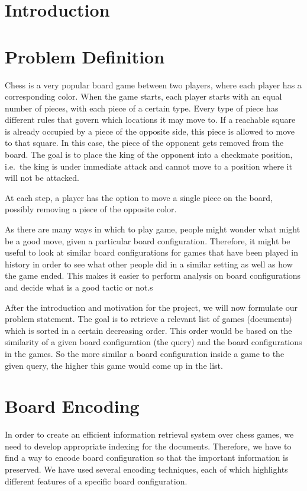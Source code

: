\documentclass[11pt]{article}
\begin{document}
    \section{Introduction}


    \section{Problem Definition}

    Chess is a very popular board game between two players, where each player has a corresponding color. When the game starts, each player starts with an equal number of pieces, with each piece of a certain type. Every type of piece has different rules that govern which locations it may move to. If a reachable square is already occupied by a piece of the opposite side, this piece is allowed to move to that square. In this case, the piece of the opponent gets removed from the board. The goal is to place the king of the opponent into a checkmate position, i.e.\ the king is under immediate attack and cannot move to a position where it will not be attacked.

    At each step, a player has the option to move a single piece on the board, possibly removing a piece of the opposite color.

    As there are many ways in which to play game, people might wonder what might be a good move, given a particular board configuration. Therefore, it might be useful to look at similar board configurations for games that have been played in history in order to see what other people did in a similar setting as well as how the game ended. This makes it easier to perform analysis on board configurations and decide what is a good tactic or not.s

    After the introduction and motivation for the project, we will now formulate our problem statement. The goal is to retrieve a relevant list of games (documents) which is sorted in a certain decreasing order. This order would be based on the similarity of a given board configuration (the query) and the board configurations in the games. So the more similar a board configuration inside a game to the given query, the higher this game would come up in the list.


    \section{Board Encoding}

    In order to create an efficient information retrieval system over chess games, we need to develop appropriate indexing for the documents. Therefore, we have to find a way to encode board configuration so that the important information is preserved. We have used several encoding techniques, each of which highlights different features of a specific board configuration.
\end{document}
